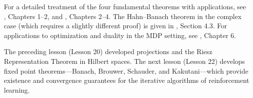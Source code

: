 \documentclass[11pt,a4paper]{article}
\begin{document}
For a detailed treatment of the four fundamental theorems with
applications, see \citet{brezis2011}, Chapters 1--2, and
\citet{rudin1991}, Chapters 2--4. The Hahn--Banach theorem in the
complex case (which requires a slightly different proof) is given in
\citet{kreyszig1989}, Section 4.3. For applications to optimization and
duality in the MDP setting, see \citet{puterman2014}, Chapter 6.

The preceding lesson (Lesson 20) developed projections and the Riesz
Representation Theorem in Hilbert spaces. The next lesson (Lesson 22)
develops fixed point theorems---Banach, Brouwer, Schauder, and
Kakutani---which provide existence and convergence guarantees for the
iterative algorithms of reinforcement learning.


\end{document}
